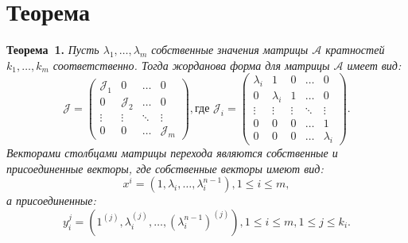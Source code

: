 \section{Теорема}
\textbf{Теорема~1.}
{ \it Пусть $\lambda_1, \ldots , \lambda_m$ собственные значения матрицы $\mathcal{A}$ кратностей $k_1, \ldots , k_m$ соответственно. Тогда жорданова форма для матрицы $\mathcal{A}$ имеет вид:
$$
	\mathcal{J} = \begin{pmatrix}
		\mathcal{J}_1 & 0 & \dots & 0 \\
		0 & \mathcal{J}_2 & \dots & 0 \\
		\vdots & \vdots & \ddots & \vdots \\
		0 & 0 & \dots & \mathcal{J}_m
	\end{pmatrix}, {\text{где }}
	\mathcal{J}_i = \begin{pmatrix}
		\lambda_i & 1 & 0 & \dots & 0 \\
		0 & \lambda_i & 1 & \dots & 0 \\
		\vdots & \vdots & \vdots & \ddots & \vdots \\
		0 & 0 & 0 & \dots & 1 \\
		0 & 0 & 0 & \dots & \lambda_i
	\end{pmatrix}.
$$
Векторами столбцами матрицы перехода являются собственные и присоединенные векторы, где собственные векторы имеют вид: 
$$x^i =(1, \lambda_i, \ldots, \lambda_i^{n-1}), 1 \leqslant i \leqslant m,$$
а присоединенные:
$$y_i^j = (1^{(j)}, \lambda_i^{(j)}, \ldots , (\lambda_i^{n-1})^{(j)}), 1 \leqslant i \leqslant m, 1 \leqslant j \leqslant k_i.$$} 


